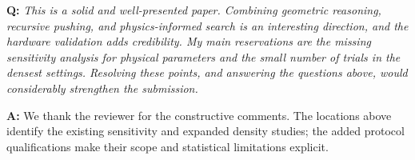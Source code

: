 \documentclass[11pt]{article}
\begin{document}
\begin{shaded*}
\noindent \textbf{Q:}
{\itshape
This is a solid and well-presented paper. Combining geometric
reasoning, recursive pushing, and physics-informed search is an
interesting direction, and the hardware validation adds credibility. My
main reservations are the missing sensitivity analysis for physical
parameters and the small number of trials in the densest settings.
Resolving these points, and answering the questions above, would
considerably strengthen the submission.
}
\end{shaded*}

\noindent \textbf{A:}
We thank the reviewer for the constructive comments. The locations above
identify the existing sensitivity and expanded density studies; the added
protocol qualifications make their scope and statistical limitations explicit.
\end{document}
